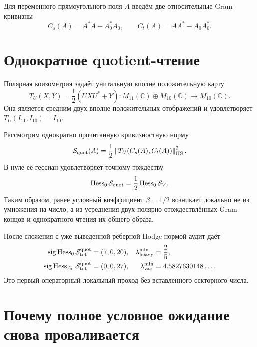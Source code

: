 Для переменного прямоугольного поля $A$ введём две относительные
Gram-кривизны
\begin{equation}
 C_s(A)=A^*A-A_0^*A_0,
 \qquad
 C_t(A)=AA^*-A_0A_0^*.
 \label{eq:v7-transfer-two-gram-curvatures}
\end{equation}

\section{Однократное quotient-чтение}

Полярная коизометрия задаёт унитальную вполне положительную карту
\begin{equation}
 T_U(X,Y)=\frac12\left(UXU^*+Y\right):
 M_{11}(\mathbb C)\oplus M_{10}(\mathbb C)\longrightarrow M_{10}(\mathbb C).
 \label{eq:v7-transfer-ucp-channel}
\end{equation}
Она является средним двух вполне положительных отображений и удовлетворяет
$T_U(I_{11},I_{10})=I_{10}$.

Рассмотрим однократно прочитанную кривизностную норму
\begin{equation}
 \mathcal S_{\rm quot}(A)
 =\frac12\left\|T_U(C_s(A),C_t(A))\right\|_{\rm HS}^2.
 \label{eq:v7-transfer-quotient-action}
\end{equation}
В нуле её гессиан удовлетворяет точному тождеству
\begin{equation}
 \operatorname{Hess}_0\mathcal S_{\rm quot}
 =\frac12\operatorname{Hess}_0\mathcal S_V.
 \label{eq:v7-transfer-half-hessian-identity}
\end{equation}
Таким образом, ранее условный коэффициент $\beta=1/2$ возникает локально не
из умножения на число, а из усреднения двух полярно отождествлённых Gram-
концов и однократного чтения их общего образа.

После сложения с уже выведенной рёберной Hodge-нормой аудит даёт
\begin{align}
 \operatorname{sig}\operatorname{Hess}_0\mathcal S_{\rm tot}^{\rm quot}
  &=(7,0,20),
 &\lambda_{\rm heavy}^{\min}&=\frac25,
 \label{eq:v7-transfer-quotient-origin-pass}\\
 \operatorname{sig}\operatorname{Hess}_{A_0}\mathcal S_{\rm tot}^{\rm quot}
  &=(0,0,27),
 &\lambda_{\rm vac}^{\min}&=4.5827630148\ldots.
 \label{eq:v7-transfer-quotient-vacuum-pass}
\end{align}
Это первый операторный локальный проход без вставленного секторного числа.

\section{Почему полное условное ожидание снова проваливается}

